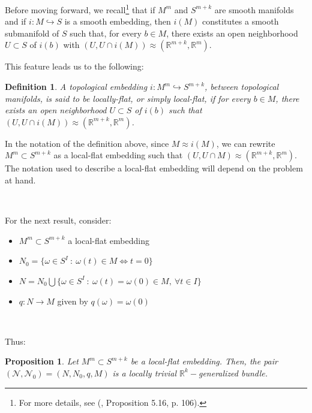 \documentclass[12pt,oneside]{book}
\newtheorem{defi}   {Definition}[chapter]
\newtheorem{prop}   {Proposition}[chapter]
\newcommand{\R}{\mathbb{R}}
\begin{document}
    Before moving forward, we recall\footnote{For more details, see (\cite{lee_s}, Proposition 5.16, p. 106).} that if \( M^{m} \) and 
    \( S^{m+k} \) are smooth manifolds and if \( i:M\hookrightarrow S \) is a smooth embedding, then \( i(M) \) 
    constitutes a smooth submanifold of \( S \) such that, for every \( b\in M \), there exists an open neighborhood \( U\subset S \) of 
    \( i(b) \) with \( (U,U\cap i(M))\approx (\mathbb{R}^{m+k},\mathbb{R}^{m}) \).
    
    This feature leads us to the following:
    
    \begin{defi}
        A topological embedding \( i:M^{m}\hookrightarrow S^{m+k} \), between topological manifolds, is said to 
        be locally-flat, or simply local-flat, if for every \( b\in M \), there exists an open neighborhood 
        \( U\subset S \) of \( i(b) \) such that \( (U,U\cap i(M))\approx (\mathbb{R}^{m+k},\mathbb{R}^{m}) \).
    \end{defi}
    
    In the notation of the definition above, since \( M\approx i(M) \), we can rewrite \( M^{m}\subset S^{m+k} \) as a local-flat embedding 
    such that \( (U,U\cap M)\approx (\mathbb{R}^{m+k},\mathbb{R}^{m}) \). The notation used to describe a local-flat embedding will depend 
    on the problem at hand.

    \
    
    For the next result, consider:
    \begin{itemize}
        \item $M^{m}\subset S^{m+k}$ a local-flat embedding
        \item $N_{0}=\{ \omega\in S^{I} \ : \ \omega(t)\in M \Leftrightarrow t=0 \}$
        \item $N=N_{0}\bigcup \{ \omega\in S^{I} \ : \ \omega(t)=\omega(0)\in M, \ \forall t\in I \}$
        \item $q:N\to M$ given by $q(\omega)=\omega(0)$
    \end{itemize}

    \
    
    Thus:
    
    \begin{prop}
        Let $M^{m}\subset S^{m+k}$ be a local-flat embedding. Then, the pair 
        $(\mathcal{N},\mathcal{N}_{0})=(N,N_{0},q,M)$ is a locally trivial $\R^{k}-$generalized bundle.
    \end{prop}
    
\end{document}
